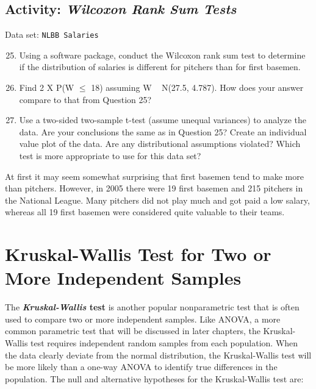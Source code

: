 \documentclass[
]{book}
\begin{document}
\hypertarget{activity-wilcoxon-rank-sum-tests}{%
\subsection*{\texorpdfstring{Activity: \emph{Wilcoxon Rank Sum Tests}}{Activity: Wilcoxon Rank Sum Tests}}\label{activity-wilcoxon-rank-sum-tests}}

Data set: \texttt{NLBB\ Salaries}

\begin{enumerate}
 \setcounter{enumi}{24}
 \item Using a software package, conduct the Wilcoxon rank sum test to determine if the distribution of salaries is different for pitchers than for first basemen.
 \item Find 2 X P(W $\leq$ 18) assuming W ~ N(27.5, 4.787). How does your answer compare to that from Question 25?
 \item Use a two-sided two-sample t-test (assume unequal variances) to analyze the data. Are your conclusions the same as in Question 25? Create an individual value plot of the data. Are any distributional assumptions violated? Which test is more appropriate to use for this data set?
\end{enumerate}

At first it may seem somewhat surprising that first basemen tend to make more than pitchers. However, in 2005 there were 19 first basemen and 215 pitchers in the National League. Many pitchers did not play much and got paid a low salary, whereas all 19 first basemen were considered quite valuable to their teams.

\hypertarget{kruskal-wallis-test-for-two-or-more-independent-samples}{%
\section{Kruskal-Wallis Test for Two or More Independent Samples}\label{kruskal-wallis-test-for-two-or-more-independent-samples}}

The \textbf{\emph{Kruskal-Wallis} test} is another popular nonparametric test that is often used to compare two or more independent samples. Like ANOVA, a more common parametric test that will be discussed in later chapters, the Kruskal-Wallis test requires independent random samples from each population. When the data clearly deviate from the normal distribution, the Kruskal-Wallis test will be more likely than a one-way ANOVA to identify true differences in the population. The null and alternative hypotheses for the Kruskal-Wallis test are:
\end{document}
